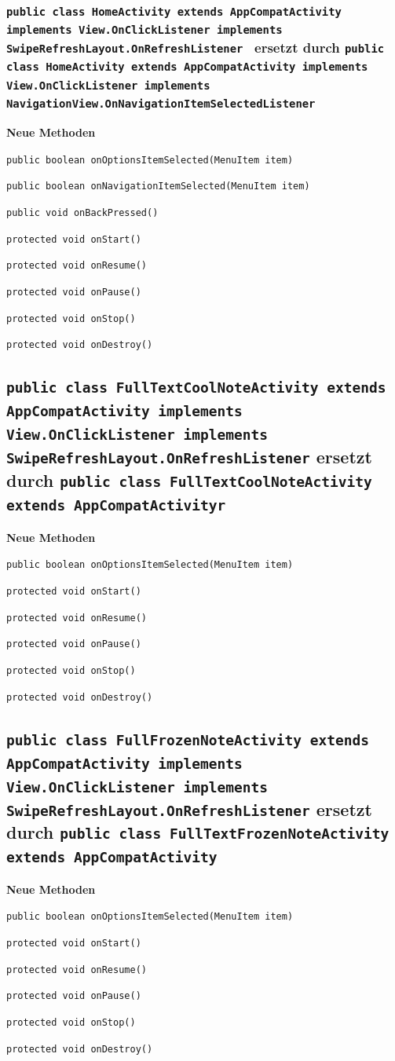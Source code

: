 \documentclass[a4paper]{scrreprt}
\begin{document}
	\subsubsection{\texttt{public class HomeActivity extends AppCompatActivity implements View.OnClickListener implements SwipeRefreshLayout.OnRefreshListener } ersetzt durch \texttt{public class HomeActivity extends AppCompatActivity implements View.OnClickListener implements NavigationView.OnNavigationItemSelectedListener }}
		\textbf{Neue Methoden}
			\item \texttt{public boolean onOptionsItemSelected(MenuItem item)}
			\item \texttt{public boolean onNavigationItemSelected(MenuItem item)}
			\item \texttt{public void onBackPressed()}
			\item \texttt{protected void onStart()}
			\item \texttt{protected void onResume()}
			\item \texttt{protected void onPause()}
			\item \texttt{protected void onStop()}
			\item \texttt{protected void onDestroy()}
			
	\subsection{\texttt{public class FullTextCoolNoteActivity extends AppCompatActivity implements View.OnClickListener implements SwipeRefreshLayout.OnRefreshListener} ersetzt durch \texttt{public class FullTextCoolNoteActivity extends AppCompatActivityr}}
		\textbf{Neue Methoden}
			\item \texttt{public boolean onOptionsItemSelected(MenuItem item)}
			\item \texttt{protected void onStart()}
			\item \texttt{protected void onResume()}
			\item \texttt{protected void onPause()}
			\item \texttt{protected void onStop()}
			\item \texttt{protected void onDestroy()}
			
	\subsection{\texttt{public class FullFrozenNoteActivity extends AppCompatActivity implements View.OnClickListener implements SwipeRefreshLayout.OnRefreshListener} ersetzt durch \texttt{public class FullTextFrozenNoteActivity extends AppCompatActivity}}
		\textbf{Neue Methoden}
			\item \texttt{public boolean onOptionsItemSelected(MenuItem item)}
			\item \texttt{protected void onStart()}
			\item \texttt{protected void onResume()}
			\item \texttt{protected void onPause()}
			\item \texttt{protected void onStop()}
			\item \texttt{protected void onDestroy()}
			
\end{document}
